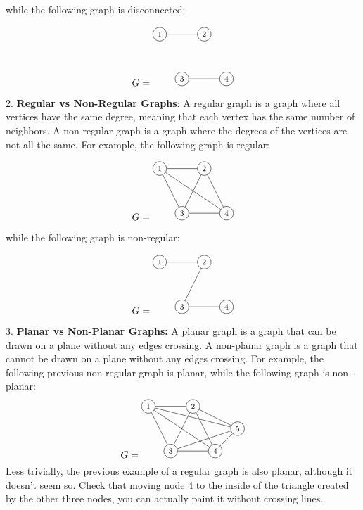 while the following graph is disconnected:

\[
G = \begin{tikzpicture}[scale=0.8, transform shape]
\node[shape=circle,draw=black] (1) at (0,2) {1};
\node[shape=circle,draw=black] (2) at (2,2) {2};
\node[shape=circle,draw=black] (3) at (1,0) {3};
\node[shape=circle,draw=black] (4) at (3,0) {4};
\draw[-] (1) -- (2);
\draw[-] (3) -- (4);
\end{tikzpicture}
\]

2. {\bf Regular vs Non-Regular Graphs}: A regular graph is a graph where all vertices have the same degree, meaning that each vertex has the same number of neighbors. A non-regular graph is a graph where the degrees of the vertices are not all the same. For example, the following graph is regular:

\[
G = \begin{tikzpicture}[scale=0.8, transform shape]
\node[shape=circle,draw=black] (1) at (0,2) {1};
\node[shape=circle,draw=black] (2) at (2,2) {2};
\node[shape=circle,draw=black] (3) at (1,0) {3};
\node[shape=circle,draw=black] (4) at (3,0) {4};
\draw[-] (1) -- (2);
\draw[-] (1) -- (3);
\draw[-] (1) -- (4);
\draw[-] (2) -- (3);
\draw[-] (2) -- (4);
\draw[-] (3) -- (4);
\end{tikzpicture}
\]

while the following graph is non-regular:

\[
G = \begin{tikzpicture}[scale=0.8, transform shape]
\node[shape=circle,draw=black] (1) at (0,2) {1};
\node[shape=circle,draw=black] (2) at (2,2) {2};
\node[shape=circle,draw=black] (3) at (1,0) {3};
\node[shape=circle,draw=black] (4) at (3,0) {4};
\draw[-] (1) -- (2);
\draw[-] (2) -- (3);
\draw[-] (3) -- (4);
\end{tikzpicture}
\]

3. {\bf Planar vs Non-Planar Graphs:} A planar graph is a graph that can be drawn on a plane without any edges crossing. A non-planar graph is a graph that cannot be drawn on a plane without any edges crossing. For example, the following previous non regular graph is planar, while the following graph is non-planar:
\[
G = \begin{tikzpicture}[scale=0.8, transform shape]
\node[shape=circle,draw=black] (1) at (0,2) {1};
\node[shape=circle,draw=black] (2) at (2,2) {2};
\node[shape=circle,draw=black] (3) at (1,0) {3};
\node[shape=circle,draw=black] (4) at (3,0) {4};
\node[shape=circle,draw=black] (5) at (4,1) {5};
\draw[-] (1) -- (2);
\draw[-] (1) -- (3);
\draw[-] (2) -- (3);
\draw[-] (3) -- (4);
\draw[-] (4) -- (1);
\draw[-] (4) -- (5);
\draw[-] (4) -- (2);
\draw[-] (1) -- (5);
\draw[-] (2) -- (5);
\draw[-] (3) -- (5);
\end{tikzpicture}
\]
Less trivially, the previous example of a regular graph is also planar, although it doesn't seem so. Check that moving node 4 to the inside of the triangle created by the other three nodes, you can actually paint it without crossing lines.

